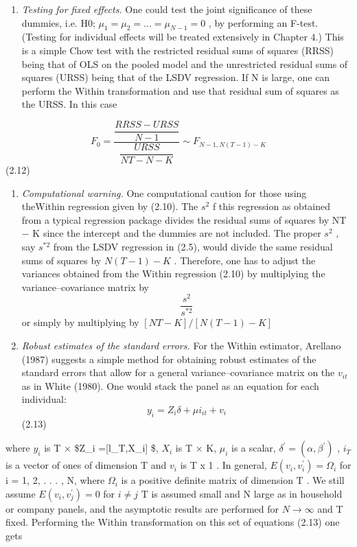 \documentclass[
]{book}
\providecommand{\tightlist}{%
  \setlength{\itemsep}{0pt}\setlength{\parskip}{0pt}}
\begin{document}
\begin{enumerate}
\def\labelenumi{(\arabic{enumi})}
\tightlist
\item
  \emph{Testing for fixed effects.} One could test the joint significance of these dummies, i.e.
  H0; \(\mu_{1}=\mu_{2}= ... = \mu_{N-1}=0\) , by performing an F-test. (Testing for individual effects will
  be treated extensively in Chapter 4.) This is a simple Chow test with the restricted residual
  sums of squares (RRSS) being that of OLS on the pooled model and the unrestricted residual
  sums of squares (URSS) being that of the LSDV regression. If N is large, one can perform the
  Within transformation and use that residual sum of squares as the URSS. In this case
\end{enumerate}

\[F_{0}=    \frac{ \dfrac{RRSS-URSS}{N-1}}{\dfrac{URSS}{NT-N-K} } \sim  F_{N-1,N(T-1)-K}           \]
(2.12)

\begin{enumerate}
\def\labelenumi{(\arabic{enumi})}
\setcounter{enumi}{1}
\item
  \emph{Computational warning.} One computational caution for those using theWithin regression
  given by (2.10). The \(s^{2}\) f this regression as obtained from a typical regression package divides
  the residual sums of squares by NT − K since the intercept and the dummies are not included.
  The proper \(s^{2}\) , say \(s^{*2}\) from the LSDV regression in (2.5), would divide the same residual
  sums of squares by \(N(T − 1) − K\) . Therefore, one has to adjust the variances obtained from
  the Within regression (2.10) by multiplying the variance--covariance matrix by \[\frac{s^{2}}{s^{*2}} \] or
  simply by multiplying by \([NT − K]/[N(T − 1) − K]\)
\item
  \emph{Robust estimates of the standard errors.} For the Within estimator, Arellano (1987)
  suggests a simple method for obtaining robust estimates of the standard errors that allow for a
  general variance--covariance matrix on the \(v_{it}\) as in White (1980). One would stack the panel
  as an equation for each individual:
  \[y_{i}= Z_{i} \delta + \mu i_{it} + v_{i} \] (2.13)
\end{enumerate}

where \(y_i\) is T × \$Z\_i ={[}l\_T,X\_i{]} \$, \(X_i\) is T × K, \(\mu _i\) is a scalar,
\(\delta ^{\prime} = (\alpha, \beta^{\prime} )\) , \(i_T\) is a vector of
ones of dimension T and \(v_i\) is T x 1 .
In general, \(E(v_i,v_i^{\prime}) = \Omega _ i\) for i = 1, 2, . . . , N, where \(\Omega _i\) is a positive definite matrix of dimension T . We still assume \(E(v_i,v_j^{\prime}) =0\) for \(i \ne j\) T is
assumed small and N large as in household or company panels, and the asymptotic results
are performed for \(N \rightarrow \infty\) and T fixed. Performing the Within transformation on this set of
equations (2.13) one gets
\end{document}
